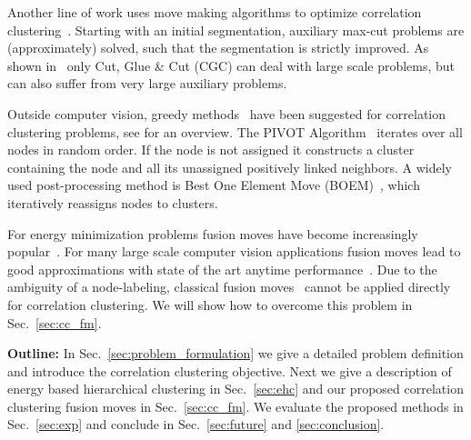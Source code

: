 Another line of work uses move making algorithms 
to optimize correlation clustering~\cite{Kernighan-1970,bagon_2011_arxiv,beier_2014_cvpr}.
Starting with an initial segmentation, auxiliary max-cut problems are (approximately) solved,
such that the segmentation is strictly improved.
As shown in~\cite{beier_2014_cvpr} only Cut, Glue \& Cut (CGC)
can deal with large scale problems, but can also suffer from very large auxiliary problems.

Outside computer vision, greedy methods~\cite{Soon-2001,Ng-2002,Gionis-2007,Elsner-2008,Ailon-2008} have been suggested for correlation clustering problems, see \cite{Elsner-2009} for an overview.
The PIVOT Algorithm~\cite{Ailon-2008} iterates over all nodes in random order.
If the node is not assigned it constructs a cluster containing the node and all its 
unassigned positively linked neighbors.  
%
A widely used post-processing method is  Best One Element Move (BOEM)~\cite{Gionis-2007}, which iteratively reassigns nodes to clusters.

For energy minimization problems fusion moves have become increasingly popular~\cite{Lempitsky-2010,kappes_2014_ws}.
For many large scale computer vision applications fusion moves lead to good approximations
with state of the art anytime performance~\cite{kappes_2014_ws}.
Due to the ambiguity of a node-labeling, classical fusion moves~\cite{Lempitsky-2010} cannot be applied directly for correlation clustering.
We will show how to overcome this problem in Sec.~\ref{sec:cc_fm}.


\vspace{0.1cm}
\noindent \textbf{Outline:} 
In Sec.~\ref{sec:problem_formulation} we give a 
detailed problem definition and introduce 
the correlation clustering objective.
Next we give a description of energy based hierarchical clustering in Sec.~\ref{sec:ehc} and
our proposed correlation clustering fusion moves in Sec.~\ref{sec:cc_fm}.
We evaluate the proposed methods in Sec.~\ref{sec:exp} and conclude in Sec.~\ref{sec:future} and \ref{sec:conclusion}.




